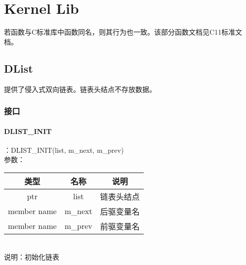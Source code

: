 %
%
%
%
%
%
%
%

\chapter{Kernel Lib}
若函数与C标准库中函数同名，则其行为也一致。该部分函数文档见C11标准文档。

\section{DList}
提供了侵入式双向链表。链表头结点不存放数据。

\subsection{接口}

\subsubsection{DLIST\_INIT}
：DLIST\_INIT(list, m\_next, m\_prev)\\
参数：\\
\begin{tabular}{|c|c|c|}
    \hline
    类型 & 名称 & 说明\\\hline
    ptr & list & 链表头结点\\\hline
    member name & m\_next & 后驱变量名\\\hline
    member name & m\_prev & 前驱变量名\\\hline
\end{tabular}\\
说明：初始化链表

